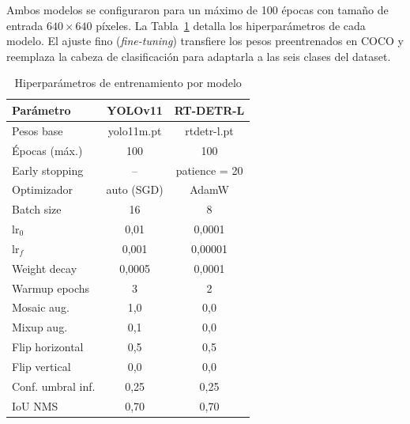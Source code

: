 \documentclass[conference]{IEEEtran}
\begin{document}
Ambos modelos se configuraron para un máximo de 100 épocas con tamaño de entrada
$640 \times 640$ píxeles. La Tabla~\ref{tab:hparams} detalla los hiperparámetros
de cada modelo. El ajuste fino (\textit{fine-tuning}) transfiere los pesos
preentrenados en COCO y reemplaza la cabeza de clasificación para adaptarla a las
seis clases del dataset.

\begin{table}[htbp]
\caption{Hiperparámetros de entrenamiento por modelo}
\label{tab:hparams}
\begin{center}
\begin{tabular}{lcc}
\toprule
\textbf{Parámetro}    & \textbf{YOLOv11}   & \textbf{RT-DETR-L}  \\
\midrule
Pesos base            & yolo11m.pt         & rtdetr-l.pt         \\
Épocas (máx.)         & 100                & 100                 \\
Early stopping        & --                 & patience = 20       \\
Optimizador           & auto (SGD)         & AdamW               \\
Batch size            & 16                 & 8                   \\
lr$_0$                & 0{,}01             & 0{,}0001            \\
lr$_f$                & 0{,}001            & 0{,}00001           \\
Weight decay          & 0{,}0005           & 0{,}0001            \\
Warmup epochs         & 3                  & 2                   \\
Mosaic aug.           & 1{,}0              & 0{,}0               \\
Mixup aug.            & 0{,}1              & 0{,}0               \\
Flip horizontal       & 0{,}5              & 0{,}5               \\
Flip vertical         & 0{,}0              & 0{,}0               \\
Conf. umbral inf.     & 0{,}25             & 0{,}25              \\
IoU NMS               & 0{,}70             & 0{,}70              \\
\bottomrule
\end{tabular}
\end{center}
\end{table}
\end{document}
